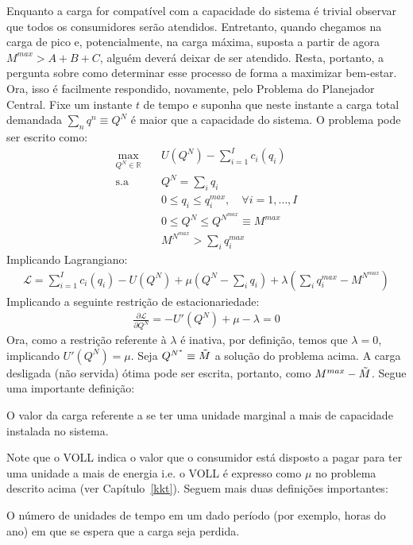 Enquanto a carga for compatível com a capacidade do sistema é trivial observar que todos os consumidores serão atendidos. Entretanto, quando chegamos na carga de pico e, potencialmente, na carga máxima, suposta a partir de agora $M^{max}>A+B+C$, alguém deverá deixar de ser atendido. Resta, portanto, a pergunta sobre como determinar esse processo de forma a maximizar bem-estar. Ora, isso é facilmente respondido, novamente, pelo Problema do Planejador Central. Fixe um instante $t$ de tempo e suponha que neste instante a carga total demandada $\sum_nq^n\equiv Q^N$ é maior que a capacidade do sistema. O problema pode ser escrito como:
\begin{align*}
    \max_{Q^N\in\mathbb{R}}&\quad U(Q^N) - \sum_{i=1}^Ic_i(q_i)\\
    \text{s.a}&\quad Q^N=\sum_iq_i\\
    &\quad 0\le q_i \le q_i^{max},\quad \forall i=1,\hdots,I\\
    &\quad 0\le Q^N \le Q^{{N^{max}}}\equiv M^{max}\\
    &\quad M^{{N^{max}}}>\sum_iq_i^{max}
\end{align*}
Implicando Lagrangiano:
\begin{align*}
    \mathcal{L}=\sum_{i=1}^Ic_i(q_i)-U(Q^N)+\mu(Q^N-\sum_iq_i)+\lambda(\sum_iq_i^{max}-M^{{N^{max}}})
\end{align*}
Implicando a seguinte restrição de estacionariedade:
\begin{align*}
    \frac{\partial\mathcal{L}}{\partial Q^N} = -U'(Q^N) + \mu - \lambda = 0
\end{align*}
Ora, como a restrição referente à $\lambda$ é inativa, por definição, temos que $\lambda=0$, implicando $U'(Q^N) = \mu $. Seja $Q^{N^*}\equiv \Tilde{M}$ a solução do problema acima. A carga desligada (não servida) ótima pode ser escrita, portanto, como $M^{max}-\Tilde{M}$. Segue uma importante definição:
\begin{defin}
    O valor da carga referente a se ter uma unidade marginal a mais de capacidade instalada no sistema. 
\end{defin}
Note que o VOLL indica o valor que o consumidor está disposto a pagar para ter uma unidade a mais de energia i.e. o VOLL é expresso como $\mu$ no problema descrito acima (ver Capítulo~\ref{kkt}). Seguem mais duas definições importantes:
\begin{defin}
    O número de unidades de tempo em um dado período (por exemplo, horas do ano) em que se espera que a carga seja perdida.
\end{defin}
